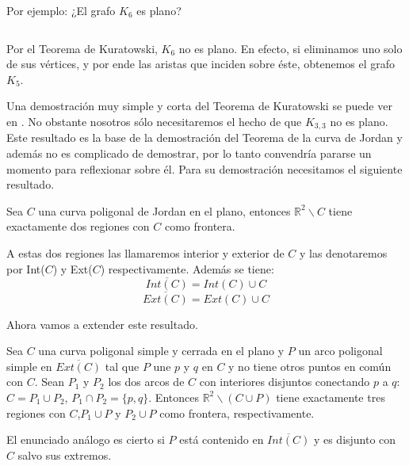 Por ejemplo: ¿El grafo $K_6$ es plano?
\[\]
\[\]
	
	Por el Teorema de Kuratowski, $K_{6}$ no es plano. En efecto, si eliminamos uno solo de sus vértices, y por ende las aristas que inciden sobre éste, obtenemos el grafo $K_5$.
	
	Una demostración muy simple y corta del Teorema de Kuratowski se puede ver en \cite{Thomassen81}. No obstante nosotros sólo necesitaremos el hecho de que $K_{3,3}$ no es plano.
	Este resultado es la base de la demostración del Teorema de la curva de Jordan y además no es complicado de demostrar, por lo tanto convendría pararse un momento para reflexionar sobre él. Para su demostración necesitamos el siguiente resultado.
	
\begin{lemma}
	Sea $C$ una curva poligonal de Jordan en el plano, entonces $\mathbb{R}^2 \backslash C$ tiene exactamente dos regiones con $C$ como frontera.
\end{lemma}

	A estas dos regiones las llamaremos interior y exterior de $C$ y las denotaremos por Int($C$) y Ext($C$) respectivamente. Además se tiene:
\[
\overline{Int(C)} = Int(C) \cup C
\]
\[
\overline{Ext(C)} = Ext(C) \cup C
\]

Ahora vamos a extender este resultado.

\begin{lemma}\label{lema24}
	Sea $C$ una curva poligonal simple y cerrada en el plano y $P$ un arco poligonal simple en $\overline{Ext(C)}$ tal que $P$ une $p$ y $q$ en $C$ y no tiene otros puntos en común con $C$. Sean $P_1$ y $P_2$ los dos arcos de $C$ con interiores disjuntos conectando $p$ a $q$: $C=P_1\cup P_2$, $P_1\cap P_2=\{p,q\}$. Entonces $\mathbb{R}^2 \backslash (C \cup P)$ tiene exactamente tres regiones con $C$,$P_{1} \cup P$ y $P_{2} \cup P$ como frontera, respectivamente.
	
El enunciado análogo es cierto si $P$ está contenido en  $\overline{Int(C)}$ y es disjunto con $C$ salvo sus extremos.
\end{lemma}

